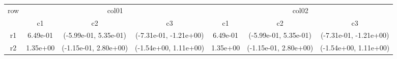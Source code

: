 \begin{tabular}{ccccccc}
\toprule
\multirow{2}{*}{row}&\multicolumn{3}{c}{col01}&\multicolumn{3}{c}{col02}\tabularnewline
\cmidrule(lr){2-4}
\cmidrule(lr){5-7}
&c1&c2&c3&c1&c2&c3\tabularnewline
\midrule
r1&6.49e-01& (-5.99e-01, 5.35e-01)& (-7.31e-01, -1.21e+00)&6.49e-01& (-5.99e-01, 5.35e-01)& (-7.31e-01, -1.21e+00)\tabularnewline
r2&1.35e+00& (-1.15e-01, 2.80e+00)& (-1.54e+00, 1.11e+00)&1.35e+00& (-1.15e-01, 2.80e+00)& (-1.54e+00, 1.11e+00)\tabularnewline
\bottomrule
\end{tabular}
